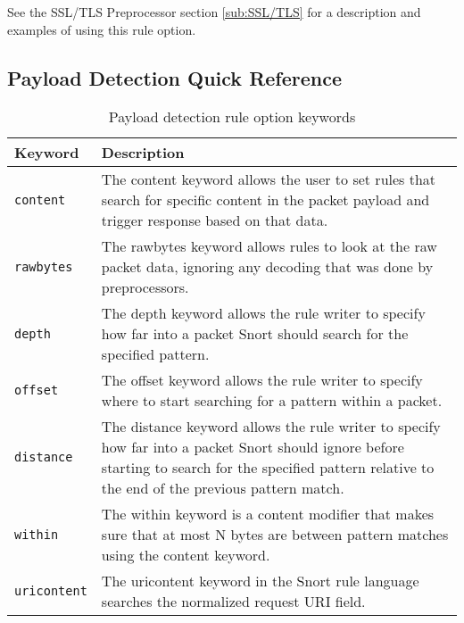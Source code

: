 \documentclass[english]{report}
\begin{document}
See the SSL/TLS Preprocessor section \ref{sub:SSL/TLS} for a description and examples of
using this rule option.

\subsection{Payload Detection Quick Reference}
\begin{center}
\begin{longtable}[h]{| p{1in} | p{4.5in} |}
\caption{Payload detection rule option keywords} \\

\hline
Keyword & Description \\
\hline

\hline
\texttt{content} &

The content keyword allows the user to set rules that search for specific
content in the packet payload and trigger response based on that data. \\

\hline
\texttt{rawbytes} &

The rawbytes keyword allows rules to look at the raw packet data, ignoring any
decoding that was done by preprocessors. \\

\hline
\texttt{depth} &

The depth keyword allows the rule writer to specify how far into a packet Snort
should search for the specified pattern. \\

\hline
\texttt{offset} &

The offset keyword allows the rule writer to specify where to start searching
for a pattern within a packet. \\

\hline
\texttt{distance} &

The distance keyword allows the rule writer to specify how far into a packet
Snort should ignore before starting to search for the specified pattern
relative to the end of the previous pattern match. \\

\hline
\texttt{within} &

The within keyword is a content modifier that makes sure that at most N bytes
are between pattern matches using the content keyword. \\

\hline
\texttt{uricontent} &

The uricontent keyword in the Snort rule language searches the normalized
request URI field. \\


\end{longtable}
\end{center}
\end{document}
